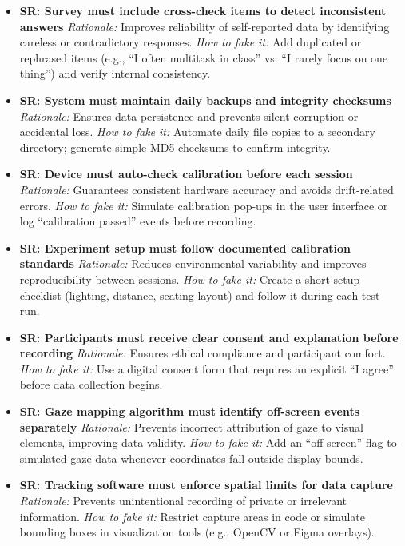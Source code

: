 \documentclass{article}
\begin{document}
\begin{itemize}
    \item \textbf{SR: Survey must include cross-check items to detect inconsistent answers}  
    \textit{Rationale:} Improves reliability of self-reported data by identifying careless or contradictory responses.  
    \textit{How to fake it:} Add duplicated or rephrased items (e.g., “I often multitask in class” vs. “I rarely focus on one thing”) and verify internal consistency.

    \item \textbf{SR: System must maintain daily backups and integrity checksums}  
    \textit{Rationale:} Ensures data persistence and prevents silent corruption or accidental loss.  
    \textit{How to fake it:} Automate daily file copies to a secondary directory; generate simple MD5 checksums to confirm integrity.

    \item \textbf{SR: Device must auto-check calibration before each session}  
    \textit{Rationale:} Guarantees consistent hardware accuracy and avoids drift-related errors.  
    \textit{How to fake it:} Simulate calibration pop-ups in the user interface or log “calibration passed” events before recording.

    \item \textbf{SR: Experiment setup must follow documented calibration standards}  
    \textit{Rationale:} Reduces environmental variability and improves reproducibility between sessions.  
    \textit{How to fake it:} Create a short setup checklist (lighting, distance, seating layout) and follow it during each test run.

    \item \textbf{SR: Participants must receive clear consent and explanation before recording}  
    \textit{Rationale:} Ensures ethical compliance and participant comfort.  
    \textit{How to fake it:} Use a digital consent form that requires an explicit “I agree” before data collection begins.

    \item \textbf{SR: Gaze mapping algorithm must identify off-screen events separately}  
    \textit{Rationale:} Prevents incorrect attribution of gaze to visual elements, improving data validity.  
    \textit{How to fake it:} Add an “off-screen” flag to simulated gaze data whenever coordinates fall outside display bounds.

    \item \textbf{SR: Tracking software must enforce spatial limits for data capture}  
    \textit{Rationale:} Prevents unintentional recording of private or irrelevant information.  
    \textit{How to fake it:} Restrict capture areas in code or simulate bounding boxes in visualization tools (e.g., OpenCV or Figma overlays).

\end{itemize}
\end{document}
